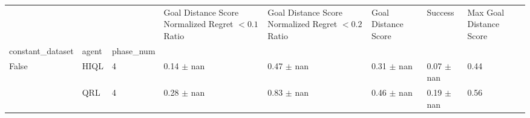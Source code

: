 \begin{tabular}{llllllll}
\toprule
 &  &  & Goal Distance Score Normalized Regret $< 0.1$ Ratio & Goal Distance Score Normalized Regret $< 0.2$ Ratio & Goal Distance Score & Success & Max Goal Distance Score \\
constant_dataset & agent & phase_num &  &  &  &  &  \\
\midrule
\multirow[t]{2}{*}{False} & HIQL & 4 & 0.14 $\pm$ nan & 0.47 $\pm$ nan & 0.31 $\pm$ nan & 0.07 $\pm$ nan & 0.44 \\
\cline{2-8}
 & QRL & 4 & 0.28 $\pm$ nan & 0.83 $\pm$ nan & 0.46 $\pm$ nan & 0.19 $\pm$ nan & 0.56 \\
\cline{1-8} \cline{2-8}
\bottomrule
\end{tabular}
